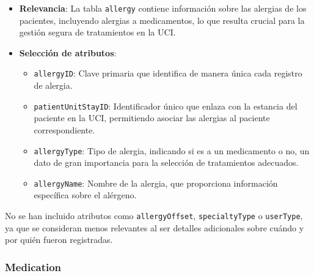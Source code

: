 \documentclass[12pt, a4paper, twoside]{article}
\begin{document}
	\begin{itemize}
		\item \textbf{Relevancia}: La tabla \texttt{allergy} contiene información sobre las alergias de los pacientes, incluyendo alergias a medicamentos, lo que resulta crucial para la gestión segura de tratamientos en la UCI.
		
		\item \textbf{Selección de atributos}:
		\begin{itemize}
			\item \texttt{allergyID}: Clave primaria que identifica de manera única cada registro de alergia.
			\item \texttt{patientUnitStayID}: Identificador único que enlaza con la estancia del paciente en la UCI, permitiendo asociar las alergias al paciente correspondiente.
			\item \texttt{allergyType}: Tipo de alergia, indicando si es a un medicamento o no, un dato de gran importancia para la selección de tratamientos adecuados.
			\item \texttt{allergyName}: Nombre de la alergia, que proporciona información específica sobre el alérgeno.
		\end{itemize}
	\end{itemize}
	
	No se han incluido atributos como \texttt{allergyOffset}, \texttt{specialtyType} o \texttt{userType}, ya que se consideran menos relevantes al ser detalles adicionales sobre cuándo y por quién fueron registradas. \cite{eICU2024}
	
	\subsubsection{Medication}
	
\end{document}

